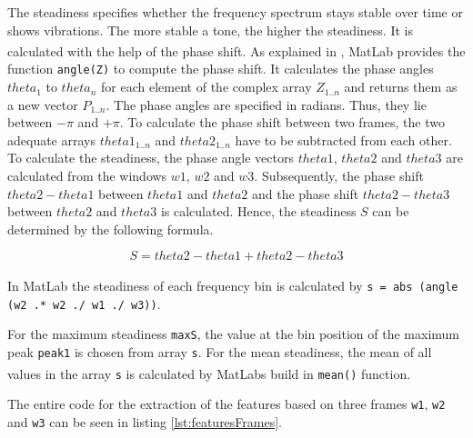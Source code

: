 
The steadiness specifies whether the frequency spectrum stays stable over time or shows vibrations. The more stable a tone, the higher the steadiness. It is calculated with the help of the phase shift. As explained in \autocite{MatLabRefAngle:2015}, MatLab\textsuperscript{\textregistered} provides the function \lstinline{angle(Z)} to compute the phase shift. It calculates the phase angles $theta_1$ to $theta_n$ for each element of the complex array $Z_{1..n}$ and returns them as a new vector $P_{1..n}$. The phase angles are specified in radians. Thus, they lie between $-\pi$ and $+\pi$. To calculate the phase shift between two frames, the two adequate arrays $theta1_{1..n}$ and $theta2_{1..n}$ have to be subtracted from each other. To calculate the steadiness, the phase angle vectors $theta1$, $theta2$ and $theta3$ are calculated from the windows $w1$, $w2$ and $w3$. Subsequently, the phase shift $theta2-theta1$ between $theta1$ and $theta2$ and the phase shift $theta2-theta3$ between $theta2$ and $theta3$ is calculated. Hence, the steadiness $S$ can be determined by the following formula.

\begin{equation}
S = theta2-theta1+theta2-theta3
\end{equation}

%

In MatLab\textsuperscript{\textregistered} the steadiness of each frequency bin is calculated by 
\lstinline{s = abs (angle (w2 .* w2 ./ w1 ./ w3))}. 

For the maximum steadiness \lstinline{maxS}, the value at the bin position of the maximum peak \lstinline{peak1} is chosen from array \lstinline{s}. For the mean steadiness, the mean of all values in the array \lstinline{s} is calculated by MatLab\textsuperscript{\textregistered}s build in \lstinline{mean()} function.

The entire code for the extraction of the features based on three frames \lstinline{w1}, \lstinline{w2} and \lstinline{w3} can be seen in listing \ref{lst:featuresFrames}.

